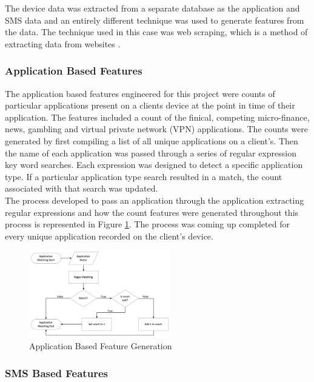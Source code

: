 The device data was extracted from a separate database as the application and SMS data and an entirely different technique was used to generate features from the data. The technique used in this case was web scraping, which is a method of extracting data from websites \parencite{WebScraping}. 

\subsubsection{Application Based Features}

The application based features engineered for this project were counts of particular applications present on a clients device at the point in time of their application. The features included a count of the finical, competing micro-finance, news, gambling and virtual private network (VPN) applications. The counts were generated by first compiling a list of all unique applications on a client's. Then the name of each application was passed through a series of regular expression key word searches. Each expression was designed to detect a specific application type. If  a particular application type search resulted in a match, the count associated with that search was updated. \\

The process developed to pass an application through the application extracting regular expressions and how the count features were generated throughout this process is represented in Figure \ref{fig:app_features}. The process was coming up completed for every unique application recorded on the client's device. 


\vspace{10 pt}

\begin{figure}[!htb]
\centering
\includegraphics[width=0.55\textwidth]{images/app_feats.png}
\caption{Application Based Feature Generation}
\label{fig:app_features}
\end{figure}


\subsubsection{SMS Based Features}

